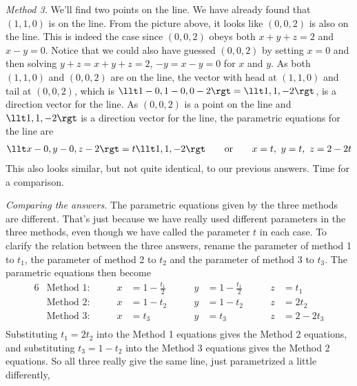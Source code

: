 \begin{eg}
\smallskip
\noindent\emph{Method 3.} We'll find two points on the line. We
have already found that $(1,1,0)$ is on the line. From the picture above,
it looks like $(0,0,2)$ is also on the line. This is indeed the case
since $(0,0,2)$ obeys both $x+y+z=2$ and $x-y=0$. Notice that we could also have
guessed $(0,0,2)$ by setting $x=0$  and then solving $y+z=x+y+z=2$, $-y=x-y=0$
for $x$ and $y$. As both $(1,1,0)$
and $(0,0,2)$ are on the line, the vector with head at $(1,1,0)$ and tail
at $(0,0,2)$, which is $\llt 1-0,1-0,0-2\rgt =\llt 1,1,-2\rgt $, is a direction vector for the 
line. As $(0,0,2)$ is a point on the line and $\llt 1,1,-2\rgt $ is a direction
vector for the line, the parametric equations for the line are
\begin{align*}
\llt x-0,y-0,z-2\rgt =t\llt 1,1,-2\rgt \qquad\text{or}\qquad
x=t,\ y=t,\ z=2-2t
\end{align*}
This also looks similar, but not quite identical, to our previous answers.
Time for a comparison.

\smallskip
\noindent\emph{Comparing the answers.}
The parametric equations given by the three methods are different. That's
just because we have really used different parameters in the three methods,
even though we have called the parameter $t$ in each case. 
To clarify the relation
between the three answers, rename the parameter of method 1 to $t_1$,
the parameter of method 2 to $t_2$ and the parameter of method 3 to $t_3$.
The parametric equations then become
\begin{alignat*}{6}
&\text{Method 1:}\qquad &
   x&=1-\frac{t_1}{2}\qquad &
   y&=1-\frac{t_1}{2}\qquad & 
   z&=t_1 \\
&\text{Method 2:}\qquad &
   x&=1-t_2\qquad &
   y&=1-t_2\qquad & 
   z&=2t_2 \\
&\text{Method 3:}\qquad &
   x&=t_3\qquad &
   y&=t_3\qquad & 
   z&=2-2t_3 \\
\end{alignat*}  
Substituting $t_1=2t_2$ into the Method 1 equations gives the Method 2
equations, and substituting $t_3=1-t_2$ into the Method 3 equations gives 
the Method 2 equations. So all three really give the same line, just parametrized a little differently,

\end{eg}

